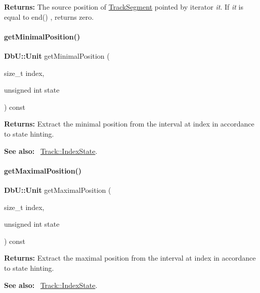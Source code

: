 {\bfseries Returns\+:} The source position of \mbox{\hyperlink{classKite_1_1TrackSegment}{Track\+Segment}} pointed by iterator {\itshape it}. If {\itshape it} is equal to {\ttfamily end()} , returns zero. \mbox{\label{classKite_1_1Track_a22b708f606d8d95b52e297d7bc2cab55}} 
\paragraph{\texorpdfstring{get\+Minimal\+Position()}{getMinimalPosition()}}
{\footnotesize\ttfamily \textbf{ Db\+U\+::\+Unit} get\+Minimal\+Position (\begin{DoxyParamCaption}\item[{size\+\_\+t}]{index,  }\item[{unsigned int}]{state }\end{DoxyParamCaption}) const}

{\bfseries Returns\+:} Extract the minimal position from the interval at {\ttfamily index} in accordance to {\ttfamily state} hinting.

{\bfseries See also\+:}~ \mbox{\hyperlink{classKite_1_1Track_af4bdc8469c0fee386fc2ff30e0666bca}{Track\+::\+Index\+State}}. \mbox{\label{classKite_1_1Track_a68124797edd88ebaf3c9aa00d6ee7822}} 
\paragraph{\texorpdfstring{get\+Maximal\+Position()}{getMaximalPosition()}}
{\footnotesize\ttfamily \textbf{ Db\+U\+::\+Unit} get\+Maximal\+Position (\begin{DoxyParamCaption}\item[{size\+\_\+t}]{index,  }\item[{unsigned int}]{state }\end{DoxyParamCaption}) const}

{\bfseries Returns\+:} Extract the maximal position from the interval at {\ttfamily index} in accordance to {\ttfamily state} hinting.

{\bfseries See also\+:}~ \mbox{\hyperlink{classKite_1_1Track_af4bdc8469c0fee386fc2ff30e0666bca}{Track\+::\+Index\+State}}. 

